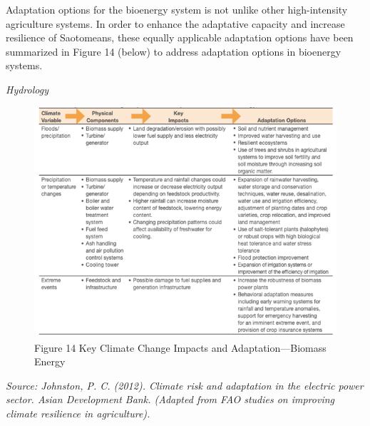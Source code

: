 \documentclass[
]{book}
\begin{document}
Adaptation options for the bioenergy system is not unlike other high-intensity agriculture systems. In order to enhance the adaptative capacity and increase resilience of Saotomeans, these equally applicable adaptation options have been summarized in Figure 14 (below) to address adaptation options in bioenergy systems.

\emph{Hydrology}

\begin{figure}
\centering
\includegraphics{images/biomass_biofuels.png}
\caption{Figure 14 Key Climate Change Impacts and Adaptation---Biomass Energy}
\end{figure}

\emph{Source: Johnston, P. C. (2012). Climate risk and adaptation in the electric power sector. Asian Development Bank. (Adapted from FAO studies on improving climate resilience in agriculture).}
\end{document}
